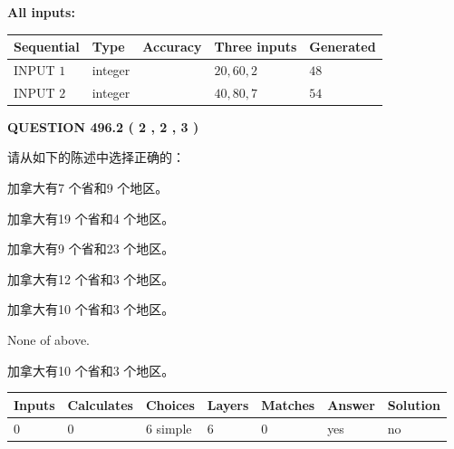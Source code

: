 \documentclass{ctexart}
\begin{document}
   
   
   
\noindent\vspace{0.1in}\hspace{-0.08in} {\textbf{\Large{All inputs: }}}
   
   
  
  
\noindent\begin{tabular}{|l|l|l|l|l|}
\hline
 Sequential & Type & Accuracy & Three inputs & Generated \\ 
\hline
 
 
  INPUT $  1 $ & integer &  & $
 20
 , 
 60
 , 
 2
 $ & $ 48 $ 
 \\  \hline  
 
 
  INPUT $  2 $ & integer &  & $
 40
 , 
 80
 , 
 7
 $ & $ 54 $ 
 \\  \hline  
 \end{tabular}
   
   
  
\vspace{0.2in}
  
{\textbf{\Large{QUESTION
496.2 
 ( 2 , 2 , 3 )
}}}
  
  
请从如下的陈述中选择正确的：
 
 
加拿大有7 个省和9 个地区。
 
 
加拿大有19 个省和4 个地区。
 
 
加拿大有9 个省和23 个地区。
 
 
加拿大有12 个省和3 个地区。
 
 
加拿大有10 个省和3 个地区。
 
 
 None of above.
 
 
\noindent{}
 
 
加拿大有10 个省和3 个地区。
 
 
\noindent{}
 
 
   
   
   
   
\noindent\begin{tabular}{|l|l|l|l|l|l|l|}
 \hline
Inputs & Calculates & Choices & Layers & Matches & Answer & Solution \\ \hline
 0  & 
 0  & 
 6
  simple  
  & 
 6  & 
 0  & 
  yes & 
  no 
  \\ \hline
 \end{tabular}
   
\end{document}
